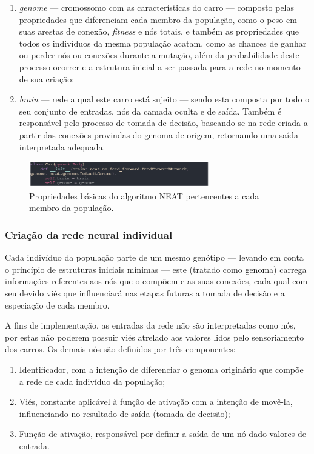 \begin{enumerate}
	\item \textit{genome} — cromossomo com as características do carro — composto pelas propriedades que diferenciam cada membro da população, como o peso em suas arestas de conexão, \textit{fitness} e nós totais, e também as propriedades que todos os indivíduos da mesma população acatam, como as chances de ganhar ou perder nós ou conexões durante a mutação, além da probabilidade deste processo ocorrer e a estrutura inicial a ser passada para a rede no momento de sua criação; 
	\item \textit{brain} —  rede a qual este carro está sujeito — sendo esta composta por todo o seu conjunto de entradas, nós da camada oculta e de saída. Também é responsável pelo processo de tomada de decisão, baseando-se na rede criada a partir das conexões provindas do genoma de origem, retornando uma saída interpretada adequada.
\end{enumerate}

\begin{figure}[htb]
        \centering
        \caption{\label{fig_DA}Propriedades básicas do algoritmo NEAT pertencentes a cada membro da população.}
        \includegraphics[width=0.7\textwidth]{images/DA.png}
\end{figure}

\subsubsection{Criação da rede neural individual}
Cada indivíduo da população parte de um mesmo genótipo — levando em conta o princípio de estruturas iniciais mínimas —
este (tratado como genoma) carrega informações referentes aos nós que o compõem e as suas conexões,
cada qual com seu devido viés que influenciará nas etapas futuras a tomada de decisão e a especiação de cada membro.

A fins de implementação, as entradas da rede não são interpretadas como nós, por estas não poderem possuir
viés atrelado aos valores lidos pelo sensoriamento dos carros. Os demais nós são definidos por três componentes: 

\begin{enumerate}
	\item Identificador, com a intenção de diferenciar o genoma originário que compõe a rede de cada indivíduo da população;
	\item Viés, constante aplicável à função de ativação com a intenção de movê-la, influenciando no resultado de saída (tomada de decisão);
	\item Função de ativação, responsável por definir a saída de um nó dado valores de entrada.
\end{enumerate}


